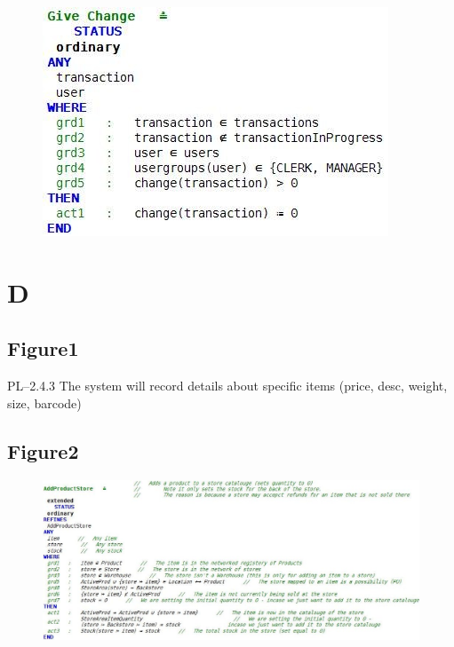 \begin{figure}[htbp]
\centering
\includegraphics[keepaspectratio,width=\textwidth,height=0.75\textheight]{4.jpg}
\label{}
\end{figure}


 \pagebreak 

\section{D}
\label{d}

\subsection{Figure1}
\label{figure1}

PL--2.4.3 The system will record details about specific items (price, desc, weight, size, barcode)

\subsection{Figure2}
\label{figure2}

\begin{figure}[htbp]
\centering
\includegraphics[keepaspectratio,width=\textwidth,height=0.75\textheight]{5.jpg}
\label{}
\end{figure}





